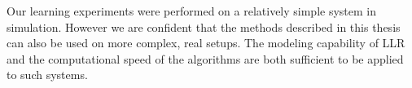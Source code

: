 Our learning experiments were performed on a relatively simple system in simulation. However we are confident that the methods described in this thesis can also be used on more complex, real setups. The modeling capability of \ac{LLR} and the computational speed of the algorithms are both sufficient to be applied to such systems.

